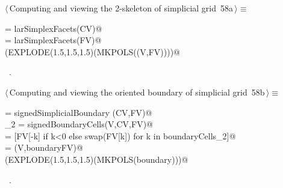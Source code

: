 \documentclass[11pt,oneside]{article}	%
\begin{document}
\begin{flushleft} \small \label{scrap107}
\protect{}$\langle\,$Computing and viewing the 2-skeleton of simplicial grid\nobreak\ {\footnotesize 58a}$\,\rangle\equiv$
\vspace{-1ex}
\begin{list}{}{} \item
\mbox{}\verb@FV = larSimplexFacets(CV)@\\
\mbox{}\verb@EV = larSimplexFacets(FV)@\\
\mbox{}\verb@VIEW(EXPLODE(1.5,1.5,1.5)(MKPOLS((V,FV))))@\\
\mbox{}\verb@@{\NWsep}
\end{list}
\vspace{-1ex}
\footnotesize\addtolength{\baselineskip}{-1ex}
\begin{list}{}{\setlength{\itemsep}{-\parsep}\setlength{\itemindent}{-\leftmargin}}
\item \NWtxtMacroRefIn\ .
\end{list}
\end{flushleft}

\begin{flushleft} \small \label{scrap108}
\protect{}$\langle\,$Computing and viewing the oriented boundary of simplicial grid\nobreak\ {\footnotesize 58b}$\,\rangle\equiv$
\vspace{-1ex}
\begin{list}{}{} \item
\mbox{}\verb@csrSignedBoundaryMat = signedSimplicialBoundary (CV,FV)@\\
\mbox{}\verb@boundaryCells_2 = signedBoundaryCells(V,CV,FV)@\\
\mbox{}\verb@boundaryFV = [FV[-k] if k<0 else swap(FV[k]) for k in boundaryCells_2]@\\
\mbox{}\verb@boundary = (V,boundaryFV)@\\
\mbox{}\verb@VIEW(EXPLODE(1.5,1.5,1.5)(MKPOLS(boundary)))@\\
\mbox{}\verb@@{\NWsep}
\end{list}
\vspace{-1ex}
\footnotesize\addtolength{\baselineskip}{-1ex}
\begin{list}{}{\setlength{\itemsep}{-\parsep}\setlength{\itemindent}{-\leftmargin}}
\item \NWtxtMacroRefIn\ .
\end{list}
\end{flushleft}
\end{document}

